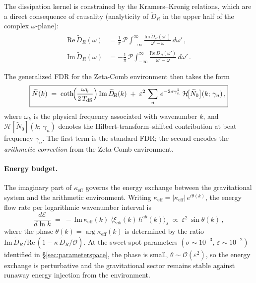 \documentclass[12pt,a4paper]{article}
\begin{document}
The dissipation kernel is constrained by the Kramers--Kronig relations,
which are a direct consequence of causality (analyticity of
$\widetilde{D}_{\!R}$ in the upper half of the complex $\omega$-plane):
%
\begin{align}
  \mathrm{Re}\,\widetilde{D}_{\!R}(\omega)
  &= \frac{1}{\pi}\,\mathcal{P}\!\int_{-\infty}^{\infty}
     \frac{\mathrm{Im}\,\widetilde{D}_{\!R}(\omega')}
          {\omega' - \omega}\, d\omega'\,,
  \label{eq:KK1}
  \\[4pt]
  \mathrm{Im}\,\widetilde{D}_{\!R}(\omega)
  &= -\frac{1}{\pi}\,\mathcal{P}\!\int_{-\infty}^{\infty}
     \frac{\mathrm{Re}\,\widetilde{D}_{\!R}(\omega')}
          {\omega' - \omega}\, d\omega'\,.
  \label{eq:KK2}
\end{align}

\noindent
The generalized FDR for the Zeta-Comb environment then takes the form
%
\begin{equation}
  \boxed{
  \widetilde{N}(k)
  \;=\;
  \coth\!\Bigl(\frac{\omega_k}{2\,T_{\mathrm{dS}}}\Bigr)\,
  \mathrm{Im}\,\widetilde{D}_{\!R}(k)
  \;+\;
  \varepsilon^2\,
  \sum_{n}\,
  e^{-2\sigma\gamma_n^2}\;
  \mathcal{H}\!\bigl[\widetilde{N}_0\bigr](k;\,\gamma_n)\,,
  }
  \label{eq:FDRgeneralized}
\end{equation}
%
where $\omega_k$ is the physical frequency associated with wavenumber $k$,
and $\mathcal{H}[\widetilde{N}_0](k;\,\gamma_n)$ denotes the
Hilbert-transform--shifted contribution at beat frequency $\gamma_n$.
The first term is the standard FDR; the second encodes the
\emph{arithmetic correction} from the Zeta-Comb environment.

\paragraph{Energy budget.}
The imaginary part of $\kappa_{\mathrm{eff}}$ governs the energy exchange
between the gravitational system and the arithmetic environment.
Writing $\kappa_{\mathrm{eff}} = |\kappa_{\mathrm{eff}}|\,
e^{i\theta(k)}$, the energy flow rate per logarithmic wavenumber
interval is
%
\begin{equation}
  \frac{d\mathcal{E}}{d\ln k}
  \;=\;
  -\,\mathrm{Im}\,\kappa_{\mathrm{eff}}(k)\;
  \bigl\langle \xi_{ab}(k)\,h^{ab}(k) \bigr\rangle_s
  \;\propto\;
  \varepsilon^2\,
  \sin\theta(k)\,,
  \label{eq:energyflow}
\end{equation}
%
where the phase $\theta(k) = \arg\kappa_{\mathrm{eff}}(k)$ is determined
by the ratio $\mathrm{Im}\,\widetilde{D}_{\!R}/
\mathrm{Re}\,(1 - \kappa\,\widetilde{D}_{\!R}/\mathcal{O})$.
At the sweet-spot parameters $(\sigma \sim 10^{-3},\,
\varepsilon \sim 10^{-2})$ identified in \S\ref{sec:parameterspace},
the phase is small, $\theta \sim \mathcal{O}(\varepsilon^2)$, so the
energy exchange is perturbative and the gravitational sector remains
stable against runaway energy injection from the environment.
\end{document}
